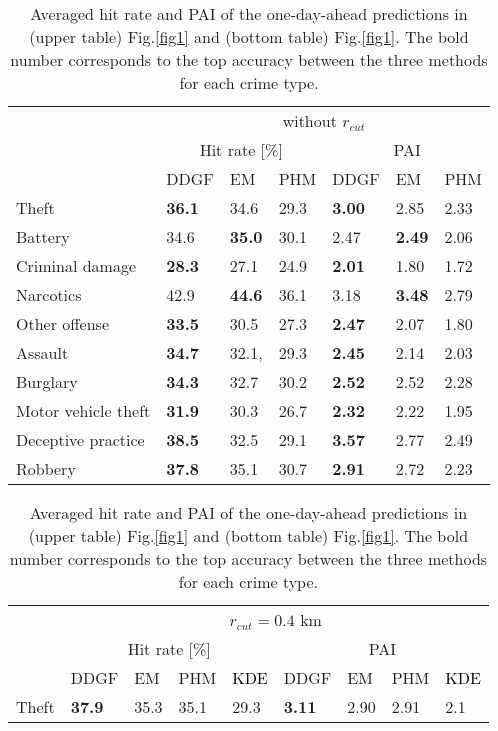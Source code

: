 \documentclass[review]{elsarticle}
\newcommand{\red}[1]{\textcolor{black}{#1}}
\begin{document}
\begin{table}
\caption{
Averaged hit rate and PAI 
of the one-day-ahead predictions in (upper table) Fig.\ref{fig1} and (bottom table) Fig.\ref{fig1}.
The bold number corresponds to the top accuracy between the three methods for each crime type.}
\begin{center}
\begin{tabular}{@{}p{9em}p{3em}p{3em}p{3em}p{3em}p{3em}p{3em}@{}}
\toprule[1.0pt]
 & \multicolumn{6}{c}{without $r_{cut}$} \\
 & \multicolumn{3}{c}{Hit rate [\%]} & \multicolumn{3}{c}{PAI} \\ \cmidrule(r){2-4}\cmidrule(r){5-7}
 & DDGF & EM & PHM & DDGF & EM & PHM\\ \midrule
Theft  &\bf 36.1& 34.6 &  29.3& \bf 3.00 & 2.85 & 2.33 \\
Battery & 34.6 &\bf  35.0 & 30.1& 2.47 &\bf  2.49 & 2.06\\
Criminal damage & \bf28.3 & 27.1& 24.9 & \bf2.01 & 1.80 & 1.72\\
Narcotics & 42.9 & \bf44.6 & 36.1 & 3.18&\bf 3.48& 2.79\\
Other offense & \bf33.5 & 30.5 & 27.3 & \bf2.47 & 2.07 &1.80 \\
Assault & \bf 34.7 & 32.1, & 29.3 & \bf2.45 & 2.14 & 2.03\\
Burglary & \bf34.3 & 32.7 & 30.2 & \bf 2.52 & 2.52 & 2.28\\
Motor vehicle theft & \bf31.9 & 30.3 & 26.7 & \bf2.32 & 2.22 & 1.95\\
Deceptive practice & \bf38.5 &  32.5 & 29.1 & \bf 3.57 &  2.77 &  2.49\\
Robbery & \bf 37.8 & 35.1 & 30.7 &\bf 2.91 & 2.72 &  2.23\\
\bottomrule[1.25pt]
\end{tabular}
\end{center}
\begin{center}
\begin{tabular}{@{}p{9em}p{3em}p{3em}p{3em}p{3em}p{3em}p{3em}p{3em}p{3em}@{}}
\toprule[1.0pt]
 & \multicolumn{8}{c}{$r_{cut} = 0.4$ km} \\
 & \multicolumn{4}{c}{Hit rate [\%]} & \multicolumn{4}{c}{PAI} \\ \cmidrule(r){2-5}\cmidrule(r){6-9}
 & DDGF & EM & PHM & \red{KDE} & DDGF & EM & PHM & \red{KDE} \\ \midrule
Theft                &\bf  37.9 & 35.3 & 35.1 &29.3 &\bf  3.11 & 2.90 & 2.91 & 2.1\\

\end{tabular}
\end{center}
\end{table}
\end{document}
